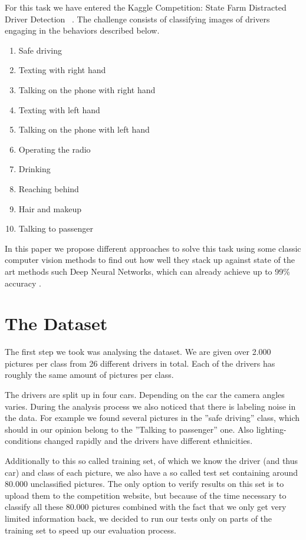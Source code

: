 \documentclass[10pt,twocolumn,letterpaper]{article}
\begin{document}
For this task we have entered the Kaggle Competition: State Farm Distracted Driver Detection ~\cite{Kaggle}. The challenge consists of classifying images of drivers engaging in the behaviors described below.

\begin{enumerate}
	\item Safe driving
	\item Texting with right hand
	\item Talking on the phone with right hand
	\item Texting with left hand
	\item Talking on the phone with left hand
	\item Operating the radio
	\item Drinking
	\item Reaching behind
	\item Hair and makeup
	\item Talking to passenger
\end{enumerate}

In this paper we propose different approaches to solve this task using some classic computer vision methods to find out how well they stack up against state of the art methods such Deep Neural Networks, which can already achieve up to 99\% accuracy .

\section{The Dataset}
The first step we took was analysing the dataset. We are given over 2.000 pictures per class from 26 different drivers in total. Each of the drivers has roughly the same amount of pictures per class. 

The drivers are split up in four cars. Depending on the car the camera angles varies. During the analysis process we also noticed that there is labeling noise in the data. For example we found several pictures in the ''safe driving'' class, which should in our opinion belong to the ''Talking to passenger'' one. Also lighting-conditions changed rapidly and the drivers have different ethnicities.


Additionally to this so called training set, of which we know the driver (and thus car) and class of each picture, we also have a so called test set containing around 80.000 unclassified pictures. The only option to verify results on this set is to upload them to the competition website, but because of the time necessary to classify all these 80.000 pictures combined with the fact that we only get very limited information back, we decided to run our tests only on parts of the training set to speed up our evaluation process.
\end{document}
